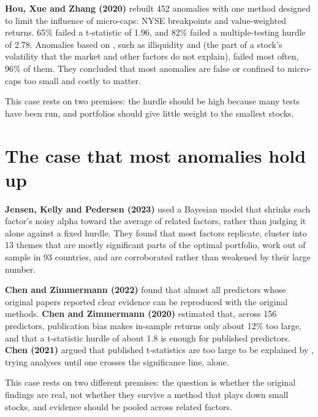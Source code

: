 \textbf{Hou, Xue and Zhang (2020)} rebuilt 452 anomalies with one method designed to limit the influence of micro-caps: NYSE breakpoints and value-weighted returns. 65\% failed a t-statistic of 1.96, and 82\% failed a multiple-testing hurdle of 2.78. Anomalies based on , such as illiquidity and  (the part of a stock's volatility that the market and other factors do not explain), failed most often, 96\% of them. They concluded that most anomalies are false or confined to micro-caps too small and costly to matter.

This case rests on two premises: the hurdle should be high because many tests have been run, and portfolios should give little weight to the smallest stocks.

\section{The case that most anomalies hold up}
\label{sec:19-defense}

\textbf{Jensen, Kelly and Pedersen (2023)} used a Bayesian model that shrinks each factor's noisy alpha toward the average of related factors, rather than judging it alone against a fixed hurdle. They found that most factors replicate, cluster into 13 themes that are mostly significant parts of the optimal portfolio, work out of sample in 93 countries, and are corroborated rather than weakened by their large number.

\textbf{Chen and Zimmermann (2022)} found that almost all predictors whose original papers reported clear evidence can be reproduced with the original methods. \textbf{Chen and Zimmermann (2020)} estimated that, across 156 predictors, publication bias makes in-sample returns only about 12\% too large, and that a t-statistic hurdle of about 1.8 is enough for published predictors. \textbf{Chen (2021)} argued that published t-statistics are too large to be explained by , trying analyses until one crosses the significance line, alone.

This case rests on two different premises: the question is whether the original findings are real, not whether they survive a method that plays down small stocks, and evidence should be pooled across related factors.


